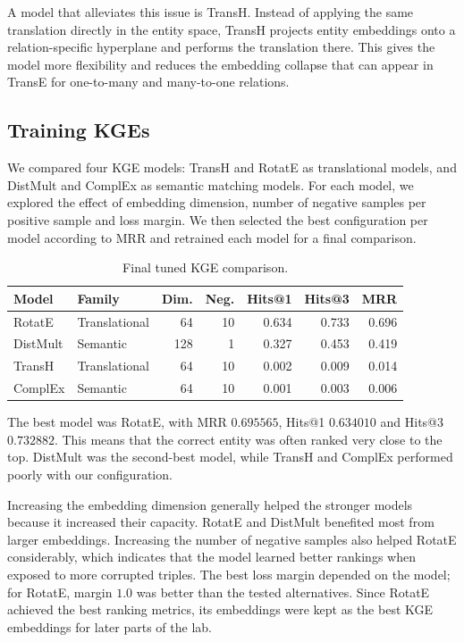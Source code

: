 \documentclass[11pt]{article}
\begin{document}
A model that alleviates this issue is TransH. Instead of applying the same translation directly in the entity space, TransH projects entity embeddings onto a relation-specific hyperplane and performs the translation there. This gives the model more flexibility and reduces the embedding collapse that can appear in TransE for one-to-many and many-to-one relations.

\subsection{Training KGEs}

We compared four KGE models: TransH and RotatE as translational models, and DistMult and ComplEx as semantic matching models. For each model, we explored the effect of embedding dimension, number of negative samples per positive sample and loss margin. We then selected the best configuration per model according to MRR and retrained each model for a final comparison.

\begin{table}[H]
\centering
\caption{Final tuned KGE comparison.}
\begin{tabular}{llrrrrr}
\toprule
Model & Family & Dim. & Neg. & Hits@1 & Hits@3 & MRR \\
\midrule
RotatE & Translational & 64 & 10 & 0.634 & 0.733 & 0.696 \\
DistMult & Semantic & 128 & 1 & 0.327 & 0.453 & 0.419 \\
TransH & Translational & 64 & 10 & 0.002 & 0.009 & 0.014 \\
ComplEx & Semantic & 64 & 10 & 0.001 & 0.003 & 0.006 \\
\bottomrule
\end{tabular}
\end{table}

The best model was RotatE, with MRR $0.695565$, Hits@1 $0.634010$ and Hits@3 $0.732882$. This means that the correct entity was often ranked very close to the top. DistMult was the second-best model, while TransH and ComplEx performed poorly with our configuration.

Increasing the embedding dimension generally helped the stronger models because it increased their capacity. RotatE and DistMult benefited most from larger embeddings. Increasing the number of negative samples also helped RotatE considerably, which indicates that the model learned better rankings when exposed to more corrupted triples. The best loss margin depended on the model; for RotatE, margin $1.0$ was better than the tested alternatives. Since RotatE achieved the best ranking metrics, its embeddings were kept as the best KGE embeddings for later parts of the lab.
\end{document}

